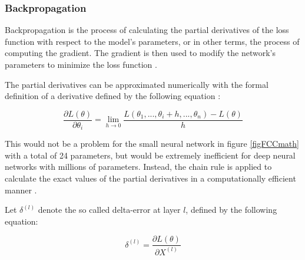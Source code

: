 \documentclass[a4paper, twoside]{article}
\newcommand*{\pd}[2]{\ensuremath{\dfrac{\partial #1}{\partial #2}}}
\newcommand*{\inpd}[2]{\ensuremath{\frac{\partial #1}{\partial #2}}}
\begin{document}
\subsubsection{Backpropagation}
Backpropagation is the process of calculating the partial derivatives of the loss function with respect to the model's parameters, or in other terms, the process of computing the gradient. The gradient is then used to modify the network's parameters to minimize the loss function \cite{wikiStanford} \cite{gradient}.

The partial derivatives can be approximated numerically with the formal definition of a derivative defined by the following equation \cite{wikiStanford} \cite{gradient}:

\begin{equation}\label{EQderivativeDefinition}
\pd{L(\theta)}{\theta_{i}} = \lim_{h \to 0} \frac{L(\theta_{1},...,\theta_{i} + h, ..., \theta_{n})-L(\theta)}{h}
\end{equation}

This would not be a problem for the small neural network in figure \ref{figFCCmath} with a total of 24 parameters, but would be extremely inefficient for deep neural networks with millions of parameters. Instead, the chain rule is applied to calculate the exact values of the partial derivatives in a computationally efficient manner \cite{cs231n}.

Let $\delta^{(l)}$ denote the so called delta-error at layer $l$, defined by the following equation:

\begin{equation}\label{deltaerrordefinition}
\delta^{(l)} = \inpd{L(\theta)}{X^{(l)}}
\end{equation}
\end{document}
